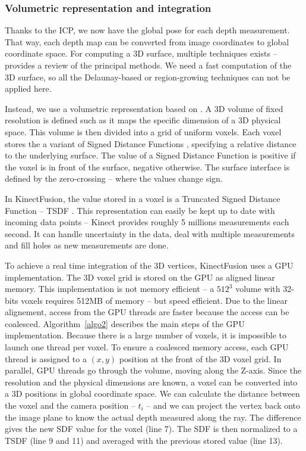 \documentclass[12pt]{article}
\begin{document}
\subsubsection{Volumetric representation and integration}
Thanks to the ICP, we now have the global pose for each depth measurement. That way, each depth map can be converted from image coordinates to global coordinate space. For computing a 3D surface, multiple techniques exists -- \cite{ISO} provides a review of the principal methods. We need a fast computation of the 3D surface, so all the Delaunay-based or region-growing techniques can not be applied here.

Instead, we use a volumetric representation based on \cite{VolRep}. A 3D volume of fixed resolution is defined such as it maps the specific dimension of a 3D physical space. This volume is then divided into a grid of uniform voxels. Each voxel stores the a variant of Signed Distance Functions \cite{SDF}, specifying a relative distance to the underlying surface. The value of a Signed Distance Function is positive if the voxel is in front of the surface, negative otherwise. The surface interface is defined by the zero-crossing -- where the values change sign.

In KinectFusion, the value stored in a voxel is a Truncated Signed Distance Function -- TSDF \cite{VolRep}. This representation can easily be kept up to date with incoming data points -- Kinect provides roughly 5 millions measurements each second. It can handle uncertainty in the data, deal with multiple measurements and fill holes as new measurements are done.

To achieve a real time integration of the 3D vertices, KinectFusion uses a GPU implementation. The 3D voxel grid is stored on the GPU as aligned linear memory. This implementation is not memory efficient -- a $512^3$ volume with 32-bits voxels requires 512MB of memory -- but speed efficient. Due to the linear alignement, access from the GPU threads are faster because the access can be coalesced. Algorithm~\ref{algo2} describes the main steps of the GPU implementation. Because there is a large number of voxels, it is impossible to launch one thread per voxel. To ensure a coalesced memory access, each GPU thread is assigned to a $(x,y)$ position at the front of the 3D voxel grid. In parallel, GPU threads go through the volume, moving along the Z-axis. Since the resolution and the physical dimensions are known, a voxel can be converted into a 3D positions in global coordinate space. We can calculate the distance between the voxel and the camera position -- $t_i$ -- and we can project the vertex back onto the image plane to know the actual depth measured along the ray. The difference gives the new SDF value for the voxel (line 7). The SDF is then normalized to a TSDF (line 9 and 11) and averaged with the previous stored value (line 13).
\end{document}
